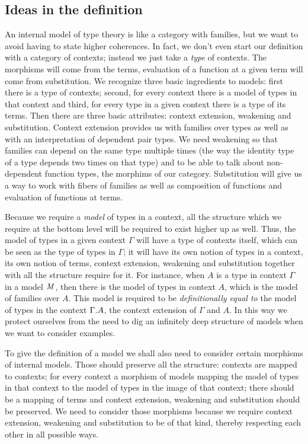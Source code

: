 \subsection{Ideas in the definition}
An internal model of type theory is like a category with families, but we want
to avoid having to state higher coherences. In fact, we don't even start our
definition with a category of contexts; instead we just take a \emph{type} of contexts. 
The morphisms will come from the terms, evaluation of a function at a given
term will come from substitution. We recognize three basic ingredients to models:
first there is a type of contexts; second, for every context there is a model of types in
that context and third, for every type in a given context there is a type of its
terms. Then there are three basic attributes: context extension, weakening and
substitution. Context extension provides us with families over types as well as
with an interpretation of dependent pair types. We need weakening 
so that families can depend on the same type multiple times (the way the
identity type of a type depends two times on that type) and to be able
to talk about non-dependent function types,
the morphims of our category. Substitution will give us a way
to work with fibers of families as well as composition of functions and evaluation
of functions at terms.

Because we require a \emph{model} of types in a context, all the structure
which we require at the bottom level will be required to exist higher up as well.
Thus, the model of types in a given context $\Gamma$ will have a type of contexts
itself, which can be seen as the type of types in $\Gamma$; it will have its
own notion of types in a context, its own notion of terms, context extension,
weakening and substitution together with all the structure require for it. For
instance, when $A$ is a type in context $\Gamma$ in a model $\mathit{M}$, then there
is the model of types in context $A$, which is the model of families over $A$. 
This model is required to be \emph{definitionally equal to} the model of types
in the context $\ctxext{\Gamma}{A}$, the context extension of $\Gamma$ and $A$.
In this way we protect ourselves from the need to dig an infinitely deep structure
of models when we want to consider examples.

To give the definition of a model we shall also need to consider certain morphisms
of internal models. Those should preserve all the structure: contexts are mapped
to contexts; for every context a morphism of models mapping the model of types
in that context to the model of types in the image of that context; there should
be a mapping of terms and context extension, weakening and substitution should be
preserved. We need to consider those morphisms because we require context extension,
weakening and substitution to be of that kind, thereby respecting each other
in all possible ways.

